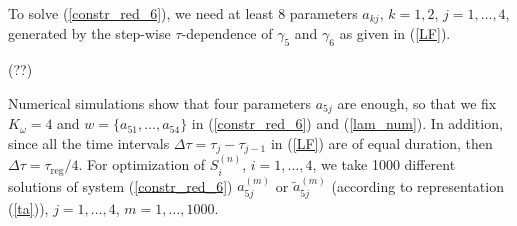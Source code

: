 \documentclass[pra,preprint,showpacs]{revtex4-1}
\begin{document}
{{To solve (\ref{constr_red_6}), we need at least 8 parameters $a_{kj}$, $k=1,2$, $j=1,\dots,4$, generated by the step-wise $\tau$-dependence of $\gamma_5$ and  $\gamma_6$ as given in (\ref{LF}).

(??)

Numerical simulations show that four parameters $a_{5j}$ are enough, so that we  fix $K_\omega=4$ and
$w=\{a_{51},\dots,a_{54}\}$ in (\ref{constr_red_6}) and (\ref{lam_num}).
In addition, since  all the time intervals $\Delta\tau=\tau_j-\tau_{j-1}$ in (\ref{LF}) are of equal duration, then $\Delta\tau= {\tau_{\mathrm{reg}}/4}$.
For optimization of $S_i^{(n)}$, $i=1,\dots,4$,
we take 1000 different solutions of system (\ref{constr_red_6}) $a^{(m)}_{5j}$ or $\tilde a^{(m)}_{5j}$ (according to representation (\ref{ta})), $j=1,\dots,4$, $m=1,\dots,1000$.

}}
\end{document}
